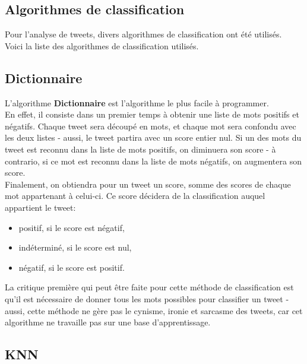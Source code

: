 \documentclass[pdftex,12pt,a4paper]{report}
\begin{document}
\begin{spacing}{1.2}
\chapter{Algorithmes de classification}

Pour l'analyse de tweets, divers algorithmes de classification ont été utilisés.\\
Voici la liste des algorithmes de classification utilisés.

\section{Dictionnaire}

L'algorithme \textbf{Dictionnaire} est l'algorithme le plus facile à programmer.\\
En effet, il consiste dans un premier temps à obtenir une liste de mots positifs et négatifs. Chaque tweet sera découpé en mots, et chaque mot sera confondu avec les deux listes - aussi, le tweet partira avec un score entier nul. Si un des mots du tweet est reconnu dans la liste de mots positifs, on diminuera son score - à contrario, si ce mot est reconnu dans la liste de mots négatifs, on augmentera son score.\\
Finalement, on obtiendra pour un tweet un score, somme des scores de chaque mot appartenant à celui-ci. Ce score décidera de la classification auquel appartient le tweet:
\begin{itemize}
\item{positif, si le score est négatif,}
\item{indéterminé, si le score est nul,}
\item{négatif, si le score est positif.}
\end{itemize}
La critique première qui peut être faite pour cette méthode de classification est qu'il est nécessaire de donner tous les mots possibles pour classifier un tweet - aussi, cette méthode ne gère pas le cynisme, ironie et sarcasme des tweets, car cet algorithme ne travaille pas sur une base d'apprentissage.

\section{KNN}


\end{spacing}
\end{document}
